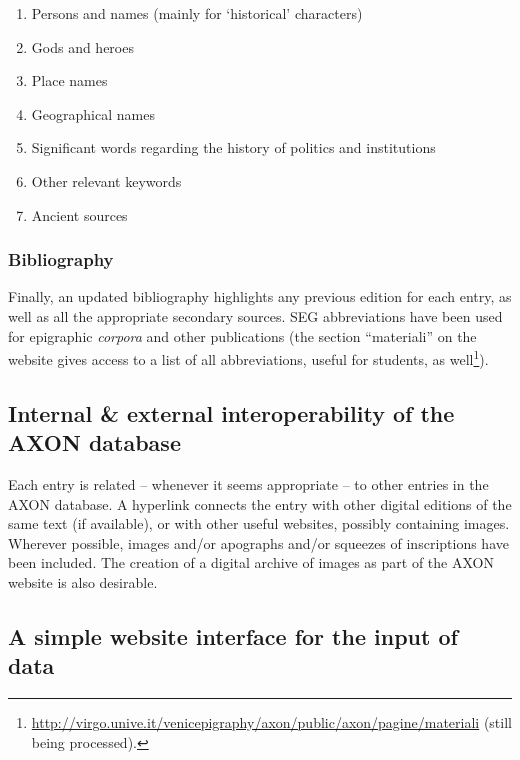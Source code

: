 \documentclass[amsthm,ebook]{saparticle}
\begin{document}
\begin{enumerate}
\renewcommand{\theenumi}{\alph{enumi}}
\item Persons and names (mainly for `historical' characters)
\item Gods and heroes
\item Place names
\item Geographical names
\item Significant words regarding the history of politics and institutions
\item Other relevant keywords
\item Ancient sources
\end{enumerate}



\subsubsection{Bibliography}


\noindent Finally, an updated bibliography highlights any previous edition for each entry, as well as all the appropriate
secondary sources. SEG abbreviations have been used for epigraphic \emph{corpora} and other publications (the section
``materiali'' on the website gives access to a list of all abbreviations, useful for students, as well\footnote{
\url{http://virgo.unive.it/venicepigraphy/axon/public/axon/pagine/materiali} (still being processed).}).




\subsection{Internal \& external interoperability of the AXON database}





\noindent Each entry is related – whenever it seems appropriate – to other entries in the AXON database. A hyperlink connects the
entry with other digital editions of the same text (if available), or with other useful websites, possibly containing
images. Wherever possible, images and/or apographs and/or squeezes of inscriptions have been included. The creation of
a digital archive of images as part of the AXON website is also desirable.




\subsection{A simple website interface for the input of data}
\end{document}
